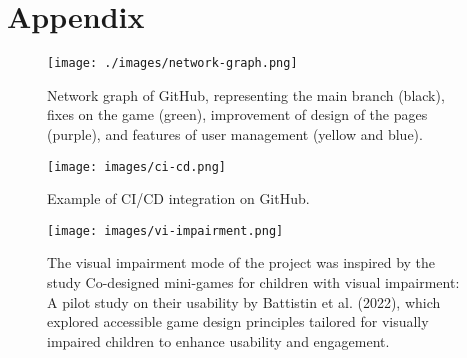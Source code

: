 
\chapter{Appendix}
\begin{appendices}

    \begin{figure}[H]
        \texttt{[image: ./images/network-graph.png]}
        \caption*{Network graph of GitHub, representing the main branch (black), fixes on the game (green), improvement of design of the pages (purple), and features of user management (yellow and blue).}
        \label{fig:network-grahp}
    \end{figure}
    
    \begin{figure}[H]
        \texttt{[image: images/ci-cd.png]}
        \caption*{Example of CI/CD integration on GitHub.}
        \label{fig:ci-cd}
    \end{figure}
    
    \begin{figure}[H]
        \texttt{[image: images/vi-impairment.png]}
        \caption*{The visual impairment mode of the project was inspired by the study Co-designed mini-games for children with visual impairment: A pilot study on their usability by Battistin et al. (2022), which explored accessible game design principles tailored for visually impaired children to enhance usability and engagement.}
        \label{fig:impairment}
    \end{figure}
    
\end{appendices}